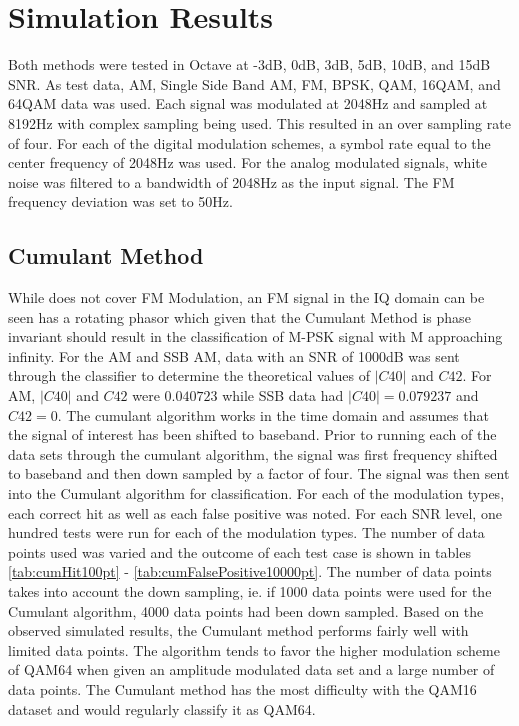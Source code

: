 \chapter{Simulation Results}

Both methods were tested in Octave at -3dB, 0dB, 3dB, 5dB, 10dB, and 15dB SNR. 
As test data, AM, Single Side Band AM, FM, BPSK, QAM, 16QAM, and 64QAM data was
used.  Each signal was modulated at 2048Hz and sampled at 8192Hz with complex
sampling being used.  This resulted in an over sampling rate of four.  For each
of the digital modulation schemes, a symbol rate equal to the center frequency
of 2048Hz was used.  For the analog modulated signals, white noise was filtered
to a bandwidth of 2048Hz as the input signal.  The FM frequency deviation was
set to 50Hz.

\section{Cumulant Method}

While \cite{swami2000} does not cover FM Modulation, an FM signal in the IQ
domain can be seen has a rotating phasor which given that the Cumulant Method is
phase invariant should result in the classification of M-PSK signal with M
approaching infinity.  
For the AM and SSB AM, data with an SNR of 1000dB was sent through the
classifier to determine the theoretical values of $|C40|$ and $C42$.  For AM,
$|C40|$ and $C42$ were $0.040723$ while SSB data had $|C40| = 0.079237$ and
$C42 = 0$.
The cumulant algorithm works in the time domain and assumes that the signal of
interest has been shifted to baseband.  Prior to running each of the data sets
through the cumulant algorithm, the signal was first frequency shifted to
baseband and then down sampled by a factor of four.  The signal was then sent
into the Cumulant algorithm for classification.  For each of the modulation
types, each correct hit as well as each false positive was noted.  For each
SNR level, one hundred tests were run for each of the modulation types.  
The number of data points used was varied and the outcome of each test case is
shown in tables \ref{tab:cumHit100pt} - \ref{tab:cumFalsePositive10000pt}.  The
number of data points takes into account the down sampling, ie. if 1000 data
points were used for the Cumulant algorithm, 4000 data points had been down
sampled.
Based on the observed simulated results, the Cumulant method performs fairly
well with limited data points.  The algorithm tends to favor the higher modulation
scheme of QAM64 when given an amplitude modulated data set and a large number of
data points.  The Cumulant method has the most difficulty with the QAM16 dataset
and would regularly classify it as QAM64.


